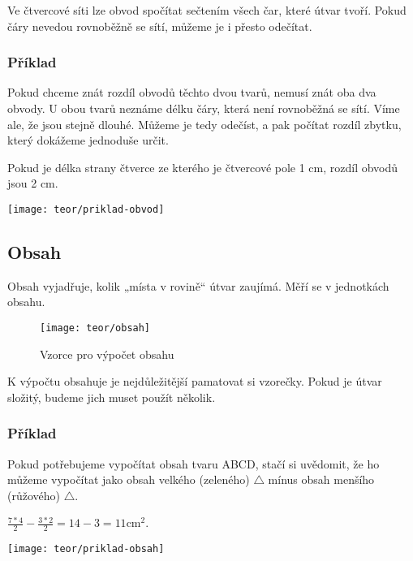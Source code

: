Ve čtvercové síti lze obvod spočítat sečtením všech čar, které útvar tvoří. Pokud čáry nevedou rovnoběžně se sítí, můžeme je i přesto odečítat.

\subsubsection{Příklad}
\begin{minipage}[t]{\linewidth}
    Pokud chceme znát rozdíl obvodů těchto dvou tvarů, nemusí znát oba dva obvody. U obou tvarů neznáme délku čáry, která není rovnoběžná se sítí. Víme ale, že jsou stejně dlouhé. Můžeme je tedy odečíst, a pak počítat rozdíl zbytku, který dokážeme jednoduše určit.

    Pokud je délka strany čtverce ze kterého je čtvercové pole 1 cm, rozdíl obvodů jsou 2 cm.
    \begin{center}
        \texttt{[image: teor/priklad-obvod]}
    \end{center}
\end{minipage}

\subsection{Obsah}
Obsah vyjadřuje, kolik „místa v rovině“ útvar zaujímá. Měří se v jednotkách obsahu.~\cite{umim_mat}
\begin{figure}[p]
    \caption{Vzorce pro výpočet obsahu~\cite{umim_mat}}
    \centering
    \texttt{[image: teor/obsah]}
\end{figure}


K výpočtu obsahuje je nejdůležitější pamatovat si vzorečky. Pokud je útvar složitý, budeme jich muset použít několik.

\subsubsection{Příklad}
\begin{minipage}[t]{\linewidth}
    Pokud potřebujeme vypočítat obsah tvaru ABCD, stačí si uvědomit, že ho můžeme vypočítat jako obsah velkého (zeleného) $\triangle$ mínus obsah menšího (růžového) $\triangle$.

    $ \frac{7*4}{2} - \frac{3*2}{2} =  14 - 3 = 11 \text{cm}^{2}$.
    \begin{center}
        \texttt{[image: teor/priklad-obsah]}
    \end{center}
\end{minipage}

